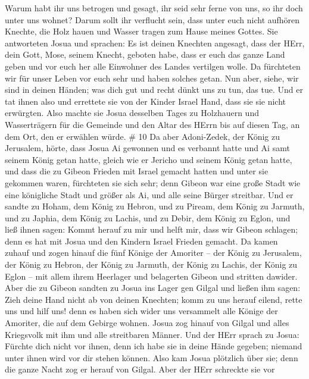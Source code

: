 Warum habt ihr uns betrogen und gesagt, ihr seid sehr ferne von uns, so
ihr doch unter uns wohnet?  Darum sollt ihr verflucht sein,
dass unter euch nicht aufhören Knechte, die Holz hauen und Wasser tragen
zum Hause meines Gottes.  Sie antworteten Josua und
sprachen: Es ist deinen Knechten angesagt, dass der HErr, dein Gott,
Mose, seinem Knecht, geboten habe, dass er euch das ganze Land geben und
vor euch her alle Einwohner des Landes vertilgen wolle. Da fürchteten
wir für unser Leben vor euch sehr und haben solches getan. 
Nun aber, siehe, wir sind in deinen Händen; was dich gut und recht dünkt
uns zu tun, das tue.  Und er tat ihnen also und errettete
sie von der Kinder Israel Hand, dass sie sie nicht erwürgten.
 Also machte sie Josua desselben Tages zu Holzhauern und
Wasserträgern für die Gemeinde und den Altar des HErrn bis auf diesen
Tag, an dem Ort, den er erwählen würde. \# 10  Da aber
Adoni-Zedek, der König zu Jerusalem, hörte, dass Josua Ai gewonnen und
es verbannt hatte und Ai samt seinem König getan hatte, gleich wie er
Jericho und seinem König getan hatte, und dass die zu Gibeon Frieden mit
Israel gemacht hatten und unter sie gekommen waren, 
fürchteten sie sich sehr; denn Gibeon war eine große Stadt wie eine
königliche Stadt und größer als Ai, und alle seine Bürger streitbar.
 Und er sandte zu Hoham, dem König zu Hebron, und zu Piream,
dem König zu Jarmuth, und zu Japhia, dem König zu Lachis, und zu Debir,
dem König zu Eglon, und ließ ihnen sagen:  Kommt herauf zu
mir und helft mir, dass wir Gibeon schlagen; denn es hat mit Josua und
den Kindern Israel Frieden gemacht.  Da kamen zuhauf und
zogen hinauf die fünf Könige der Amoriter -- der König zu Jerusalem, der
König zu Hebron, der König zu Jarmuth, der König zu Lachis, der König zu
Eglon -- mit allem ihrem Heerlager und belagerten Gibeon und stritten
dawider.  Aber die zu Gibeon sandten zu Josua ins Lager gen
Gilgal und ließen ihm sagen: Zieh deine Hand nicht ab von deinen
Knechten; komm zu uns herauf eilend, rette uns und hilf uns! denn es
haben sich wider uns versammelt alle Könige der Amoriter, die auf dem
Gebirge wohnen.  Josua zog hinauf von Gilgal und alles
Kriegsvolk mit ihm und alle streitbaren Männer.  Und der
HErr sprach zu Josua: Fürchte dich nicht vor ihnen, denn ich habe sie in
deine Hände gegeben; niemand unter ihnen wird vor dir stehen können.
 Also kam Josua plötzlich über sie; denn die ganze Nacht zog
er herauf von Gilgal.  Aber der HErr schreckte sie vor
